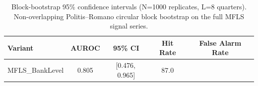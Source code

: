 \begin{table}[h]
\centering
\caption{Block-bootstrap 95\% confidence intervals (N=1000 replicates, L=8 quarters). Non-overlapping Politis--Romano circular block bootstrap on the full MFLS signal series.}
\label{tab:bootstrap_ci}
\begin{tabular}{lcccc}
\toprule
Variant & AUROC & 95\% CI & Hit Rate & False Alarm Rate \\
\midrule
MFLS_BankLevel & 0.805 & [0.476,\,0.965] & 87.0%
\bottomrule
\end{tabular}
\end{table}